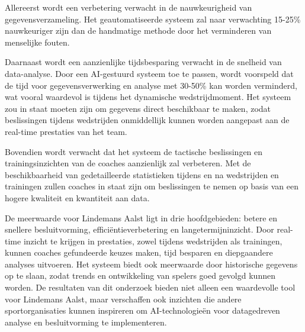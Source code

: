 Allereerst wordt een verbetering verwacht in de nauwkeurigheid van gegevensverzameling. Het geautomatiseerde systeem zal naar verwachting 15-25\% nauwkeuriger zijn dan de handmatige methode door het verminderen van menselijke fouten. 

Daarnaast wordt een aanzienlijke tijdsbesparing verwacht in de snelheid van data-analyse. Door een AI-gestuurd systeem toe te passen, wordt voorspeld dat de tijd voor gegevensverwerking en analyse met 30-50\% kan worden verminderd, wat vooral waardevol is tijdens het dynamische wedstrijdmoment. Het systeem zou in staat moeten zijn om gegevens direct beschikbaar te maken, zodat beslissingen tijdens wedstrijden onmiddellijk kunnen worden aangepast aan de real-time prestaties van het team.

Bovendien wordt verwacht dat het systeem de tactische beslissingen en trainingsinzichten van de coaches aanzienlijk zal verbeteren. Met de beschikbaarheid van gedetailleerde statistieken tijdens en na wedstrijden en trainingen zullen coaches in staat zijn om beslissingen te nemen op basis van een hogere kwaliteit en kwantiteit aan data. 

De meerwaarde voor Lindemans Aalst ligt in drie hoofdgebieden: betere en snellere besluitvorming, efficiëntieverbetering en langetermijninzicht. Door real-time inzicht te krijgen in prestaties, zowel tijdens wedstrijden als trainingen, kunnen coaches gefundeerde keuzes maken, tijd besparen en diepgaandere analyses uitvoeren. Het systeem biedt ook meerwaarde door historische gegevens op te slaan, zodat trends en ontwikkeling van spelers goed gevolgd kunnen worden. De resultaten van dit onderzoek bieden niet alleen een waardevolle tool voor Lindemans Aalst, maar verschaffen ook inzichten die andere sportorganisaties kunnen inspireren om AI-technologieën voor datagedreven analyse en besluitvorming te implementeren.
